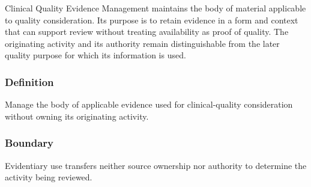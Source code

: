 Clinical Quality Evidence Management maintains the body of material applicable to quality consideration. Its purpose is to retain evidence in a form and context that can support review without treating availability as proof of quality. The originating activity and its authority remain distinguishable from the later quality purpose for which its information is used.

\subsubsection*{Definition}

Manage the body of applicable evidence used for clinical-quality consideration without owning its originating activity.

\subsubsection*{Boundary}

Evidentiary use transfers neither source ownership nor authority to determine the activity being reviewed.

